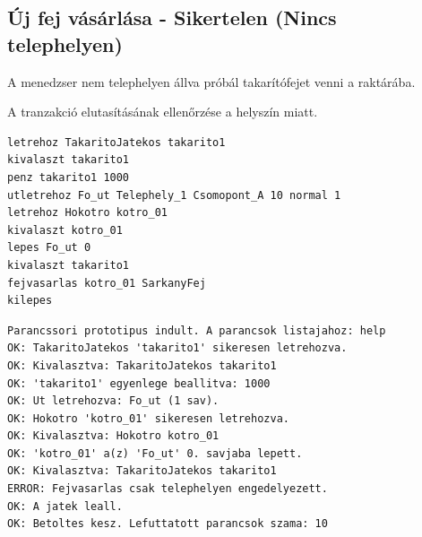 \subsection{Új fej vásárlása - Sikertelen (Nincs telephelyen)}
\begin{test-case-description}
    A menedzser nem telephelyen állva próbál takarítófejet venni a raktárába.
\end{test-case-description}
\begin{test-case-function}
    A tranzakció elutasításának ellenőrzése a helyszín miatt.
\end{test-case-function}
\begin{test-case-input}
\begin{verbatim}
letrehoz TakaritoJatekos takarito1
kivalaszt takarito1
penz takarito1 1000
utletrehoz Fo_ut Telephely_1 Csomopont_A 10 normal 1
letrehoz Hokotro kotro_01
kivalaszt kotro_01
lepes Fo_ut 0
kivalaszt takarito1
fejvasarlas kotro_01 SarkanyFej
kilepes
\end{verbatim}
\end{test-case-input}
\begin{test-case-output}
\begin{verbatim}
Parancssori prototipus indult. A parancsok listajahoz: help
OK: TakaritoJatekos 'takarito1' sikeresen letrehozva.
OK: Kivalasztva: TakaritoJatekos takarito1
OK: 'takarito1' egyenlege beallitva: 1000
OK: Ut letrehozva: Fo_ut (1 sav).
OK: Hokotro 'kotro_01' sikeresen letrehozva.
OK: Kivalasztva: Hokotro kotro_01
OK: 'kotro_01' a(z) 'Fo_ut' 0. savjaba lepett.
OK: Kivalasztva: TakaritoJatekos takarito1
ERROR: Fejvasarlas csak telephelyen engedelyezett.
OK: A jatek leall.
OK: Betoltes kesz. Lefuttatott parancsok szama: 10
\end{verbatim}
\end{test-case-output}

